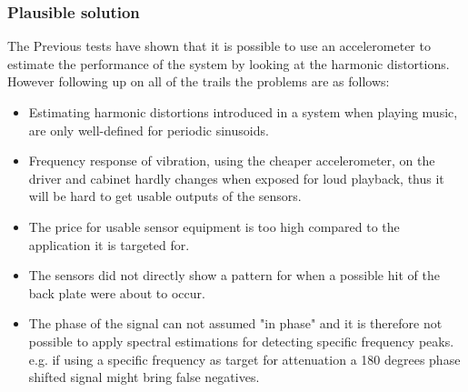 


%



%

%



\subsubsection{Plausible solution} 
The Previous tests have shown that it is possible to use an accelerometer to estimate the performance of the system by looking at the harmonic distortions. However following up on all of the trails the problems are as follows:
\begin{itemize}
\item Estimating harmonic distortions introduced in a system when playing music, are only well-defined for periodic sinusoids.
\item Frequency response of vibration, using the cheaper accelerometer, on the driver and cabinet hardly changes when exposed for loud playback, thus it will be hard to get usable outputs of the sensors.
\item The price for usable sensor equipment is too high compared to the application it is targeted for. 
\item The sensors did not directly show a pattern for when a possible hit of the back plate were about to occur.
\item The phase of the signal can not assumed "in phase" and it is therefore not possible to apply spectral estimations for detecting specific frequency peaks. e.g. if using a specific frequency as target for attenuation a 180 degrees phase shifted signal might bring false negatives. 
\end{itemize}

